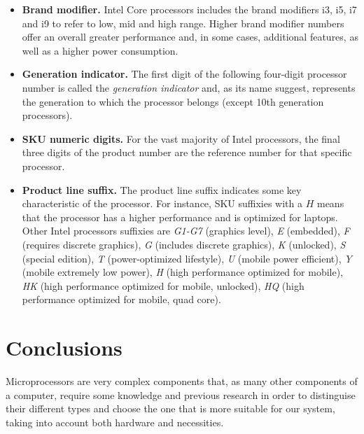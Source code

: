 \documentclass[a4paper, twoside, 11pt]{article}
\begin{document}
{\begin{itemize}
    \item\textbf{Brand modifier.} Intel Core processors includes the brand modifiers i3, i5, i7 and i9 to refer to low, mid and high range. Higher brand modifier numbers offer an overall greater performance and, in some cases, additional features, as well as a higher power consumption.

    \item\textbf{Generation indicator.} The first digit of the following four-digit processor number is called the \textit{generation indicator} and, as its name suggest, represents the generation to which the processor belongs (except 10th generation processors).

    \item\textbf{SKU numeric digits.} For the vast majority of Intel processors, the final three digits of the product number are the reference number for that specific processor. 

    \item\textbf{Product line suffix.} The product line suffix indicates some key characteristic of the processor. For instance, SKU suffixies with a $H$ means that the processor has a higher performance and is optimized for laptops. Other Intel processors suffixies are \textit{G1-G7} (graphics level), \textit{E} (embedded), \textit{F} (requires discrete graphics), \textit{G} (includes discrete graphics), \textit{K} (unlocked), \textit{S} (special edition), \textit{T} (power-optimized lifestyle), \textit{U} (mobile power efficient), \textit{Y} (mobile extremely low power), \textit{H} (high performance optimized for mobile), \textit{HK} (high performance optimized for mobile, unlocked), \textit{HQ} (high performance optimized for mobile, quad core).
\end{itemize}
}

\section{Conclusions}
\hspace{\parindent} Microprocessors are very complex components that, as many other components of a computer, require some knowledge and previous research in order to distinguise their different types and choose the one that is more suitable for our system, taking into account both hardware and necessities.
\end{document}
